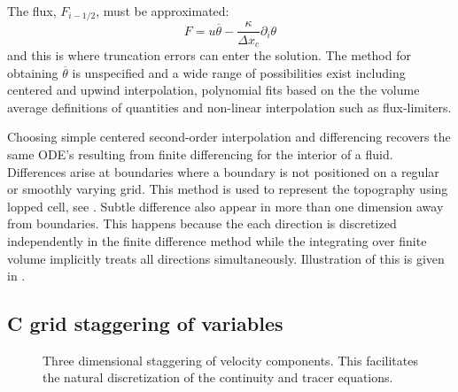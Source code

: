 The flux, $F_{i-1/2}$, must be approximated:
\begin{displaymath}
F = u \overline{\theta} - \frac{\kappa}{\Delta x_c} \partial_i \theta
\end{displaymath}
and this is where truncation errors can enter the solution. The
method for obtaining $\overline{\theta}$ is unspecified and a wide
range of possibilities exist including centered and upwind
interpolation, polynomial fits based on the the volume average
definitions of quantities and non-linear interpolation such as
flux-limiters.

Choosing simple centered second-order interpolation and differencing
recovers the same ODE's resulting from finite differencing for the
interior of a fluid. Differences arise at boundaries where a boundary
is not positioned on a regular or smoothly varying grid. This method
is used to represent the topography using lopped cell, see
\cite{adcroft:97}. Subtle difference also appear in more than one
dimension away from boundaries. This happens because the each
direction is discretized independently in the finite difference method
while the integrating over finite volume implicitly treats all
directions simultaneously. Illustration of this is given in
\cite{ac:02}.

\subsection{C grid staggering of variables}

\begin{figure}
\begin{center}
\end{center}
\caption{Three dimensional staggering of velocity components. This
facilitates the natural discretization of the continuity and tracer
equations. }
\label{fig:cgrid3d}
\end{figure}

